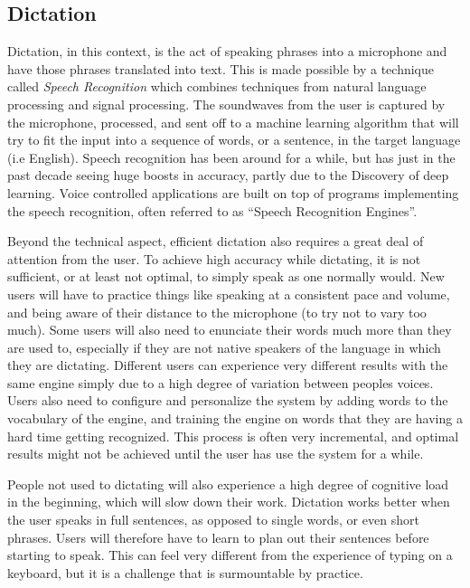 \documentclass[../thesis.tex]{subfiles}
\begin{document}
\subsection{Dictation}
Dictation, in this context, is the act of speaking phrases into a microphone and have those phrases translated into text.
This is made possible by a technique called \textit{Speech Recognition} which combines techniques from natural language processing
and signal processing. The soundwaves from the user is captured by the microphone, processed, and sent off to a machine learning algorithm
that will try to fit the input into a sequence of words, or a sentence, in the target language (i.e English). Speech recognition
has been around for a while, but has just in the past decade seeing huge boosts in accuracy, partly due to the Discovery of deep learning.
Voice controlled applications are built on top of programs implementing the speech recognition, often referred to as ``Speech Recognition Engines''.

Beyond the technical aspect, efficient dictation also requires a great deal of attention from the user.
To achieve high accuracy while dictating, it is not sufficient, or at least not optimal, to simply speak as one normally would.
New users will have to practice things like speaking at a consistent pace and volume, and being aware of their distance to the microphone (to try not to vary too much).
Some users will also need to enunciate their words much more than they are used to, especially if they are not native speakers of the language in which they are dictating.
Different users can experience very different results with the same engine simply due to a high degree of variation between peoples voices.
Users also need to configure and personalize the system by adding words to the vocabulary of the engine, and training the engine on words that they are
having a hard time getting recognized. This process is often very incremental, and optimal results might not be achieved until the user has
use the system for a while.

People not used to dictating will also experience a high degree of cognitive load in the beginning, which will slow down their work.
Dictation works better when the user speaks in full sentences, as opposed to single words, or even short phrases.
Users will therefore have to learn to plan out their sentences before starting to speak.
This can feel very different from the experience of typing on a keyboard, but it is a challenge that is surmountable by practice.
\end{document}
